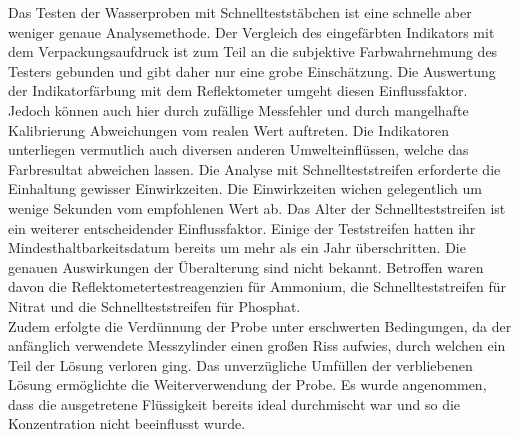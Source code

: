 Das Testen der Wasserproben mit Schnellteststäbchen ist eine schnelle aber weniger genaue Analysemethode. Der Vergleich des eingefärbten Indikators mit dem Verpackungsaufdruck ist zum Teil an die subjektive Farbwahrnehmung des Testers gebunden und gibt daher nur eine grobe Einschätzung. Die Auswertung der Indikatorfärbung mit dem Reflektometer umgeht diesen Einflussfaktor. Jedoch können auch hier durch zufällige Messfehler und durch mangelhafte Kalibrierung Abweichungen vom realen Wert auftreten. Die Indikatoren unterliegen vermutlich auch diversen anderen Umwelteinflüssen, welche das Farbresultat abweichen lassen. %
Die Analyse mit Schnellteststreifen erforderte die Einhaltung gewisser Einwirkzeiten. Die Einwirkzeiten wichen gelegentlich um wenige Sekunden vom empfohlenen Wert ab.
\newpage
Das Alter der Schnellteststreifen ist ein weiterer entscheidender Einflussfaktor. Einige der Teststreifen hatten ihr Mindesthaltbarkeitsdatum bereits um mehr als ein Jahr überschritten. Die genauen Auswirkungen der Überalterung sind nicht bekannt.
Betroffen waren davon die Reflektometertestreagenzien für Ammonium, die Schnellteststreifen für Nitrat und die Schnellteststreifen für Phosphat.\\
Zudem erfolgte die Verdünnung der Probe unter erschwerten Bedingungen, da der anfänglich verwendete Messzylinder einen großen Riss aufwies, durch welchen ein Teil der Lösung verloren ging. Das unverzügliche Umfüllen der verbliebenen Lösung ermöglichte die Weiterverwendung der Probe. Es wurde angenommen, dass die ausgetretene Flüssigkeit bereits ideal durchmischt war und so die Konzentration nicht beeinflusst wurde.  

